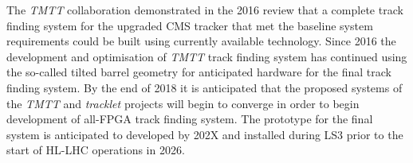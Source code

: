 The \emph{TMTT} collaboration demonstrated in the 2016 review that a complete track finding system for the upgraded CMS tracker that met the baseline system requirements could be built using currently available technology.
Since 2016 the development and optimisation of \emph{TMTT} track finding system has continued using the so-called tilted barrel geometry for anticipated hardware for the final track finding system.
By the end of 2018 it is anticipated that the proposed systems of the \emph{TMTT} and \emph{tracklet} projects will begin to converge in order to begin development of all-FPGA track finding system.
The prototype for the final system is anticipated to developed by 202X and installed during LS3 prior to the start of HL-LHC operations in 2026.

%
